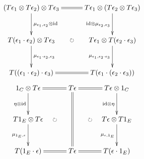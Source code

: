 \documentclass[12pt]{article}
\begin{document}
\pagestyle{empty}

\begin{align*}
  \vcenter{
    \xymatrix@=30pt{
      (T \epsilon_1 \otimes T \epsilon_2) \otimes T \epsilon_3
      \ar@{=}[r]
      \ar@{->}[d]^{\mu_{\epsilon_1,\epsilon_2} \mathbin{\otimes} \mathrm{id}}
      & T \epsilon_1 \otimes (T \epsilon_2 \otimes T \epsilon_3)
      \ar@{->}[d]_{\mathrm{id} \mathbin{\otimes} \mu_{\epsilon_2,\epsilon_3}}
      \\
      T (\epsilon_1 \cdot \epsilon_2) \otimes T \epsilon_3
      \ar@{->}[d]^{\mu_{\epsilon_1 \cdot \epsilon_2, \epsilon_3}}
      &
      T \epsilon_1 \otimes T (\epsilon_2 \cdot \epsilon_3)
      \ar@{->}[d]_{\mu_{\epsilon_1, \epsilon_2 \cdot \epsilon_3}}
      \\
      T ((\epsilon_1 \cdot \epsilon_2) \cdot \epsilon_3)
      \ar@{=}[r]
      &
      T (\epsilon_1 \cdot (\epsilon_2 \cdot \epsilon_3))
      \ar@{}[luu]|{\circlearrowright}
    }
  }
\end{align*}
\begin{align*}
  \vcenter{
    \xymatrix@=30pt{
      1_C \otimes T \epsilon
      \ar@{->}[d]_{\eta \mathbin{\otimes} \mathrm{id}}
      &
      T \epsilon \ar@{=}[dd]
      \ar@{=}[l]
      \ar@{=}[r]
      &
      T \epsilon \otimes 1_C
      \ar@{->}[d]_{\mathrm{id} \mathbin{\otimes} \eta}
      \\
      T 1_E \otimes T \epsilon
      \ar@{->}[d]_{\mu_{1_E, \epsilon}}
      & &
      T \epsilon \otimes T 1_E
      \ar@{->}[d]_{\mu_{\epsilon, 1_E}}
      \\
      T (1_E \cdot \epsilon)
      \ar@{=}[r]
      &
      T \epsilon
      \ar@/^25pt/@{{}{ }{}}[uu]|{\circlearrowright}
      \ar@/_25pt/@{{}{ }{}}[uu]|{\circlearrowright}
      &
      T (\epsilon \cdot 1_E)
      \ar@{=}[l]
    }
  }
\end{align*}
\end{document}
